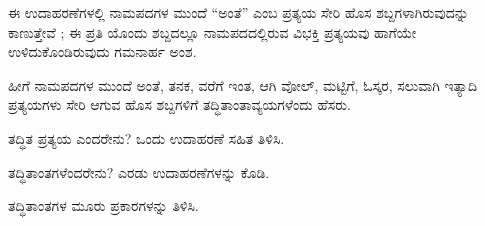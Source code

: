 \indent ಈ ಉದಾಹರಣೆಗಳಲ್ಲಿ ನಾಮಪದಗಳ ಮುಂದೆ “ಅಂತೆ” ಎಂಬ ಪ್ರತ್ಯಯ ಸೇರಿ ಹೊಸ ಶಬ್ದಗಳಾಗಿರುವುದನ್ನು ಕಾಣುತ್ತೇವೆ ; ಈ ಪ್ರತಿ ಯೊಂದು ಶಬ್ದದಲ್ಲೂ ನಾಮಪದದಲ್ಲಿರುವ ವಿಭಕ್ತಿ ಪ್ರತ್ಯಯವು ಹಾಗೆಯೇ ಉಳಿದುಕೊಂಡಿರುವುದು ಗಮನಾರ್ಹ ಅಂಶ.\par

\indent ಹೀಗೆ ನಾಮಪದಗಳ ಮುಂದೆ ಅಂತೆ, ತನಕ, ವರೆಗೆ ಇಂತ, ಆಗಿ ವೋಲ್‌, ಮಟ್ಟಿಗೆ, ಓಸ್ಕರ, ಸಲುವಾಗಿ ಇತ್ಯಾದಿ ಪ್ರತ್ಯಯಗಳು ಸೇರಿ ಆಗುವ ಹೊಸ ಶಬ್ದಗಳಿಗೆ ತದ್ಧಿತಾಂತಾವ್ಯಯಗಳೆಂದು ಹೆಸರು.\par

\vspace{3pt plus 2pt}\noindent\hspace*{1.2em}\par\vspace{1pt}

\vspace{5pt plus 4pt minus 1pt}
\vspace{5pt plus 4pt minus 1pt}


\vspace{2.5pt plus 3pt minus 0.5pt}\noindent\hspace*{1.2em}\hspace{0.55em}ತದ್ಧಿತ ಪ್ರತ್ಯಯ ಎಂದರೇನು? ಒಂದು ಉದಾಹರಣೆ ಸಹಿತ ತಿಳಿಸಿ.\par

\vspace{2.5pt plus 3pt minus 0.5pt}\noindent\hspace*{1.2em}\hspace{0.55em}ತದ್ಧಿತಾಂತಗಳೆಂದರೇನು? ಎರಡು ಉದಾಹರಣೆಗಳನ್ನು ಕೊಡಿ.\par

\vspace{2.5pt plus 3pt minus 0.5pt}\noindent\hspace*{1.2em}\hspace{0.55em}ತದ್ಧಿತಾಂತಗಳ ಮೂರು ಪ್ರಕಾರಗಳನ್ನು ತಿಳಿಸಿ.\par

